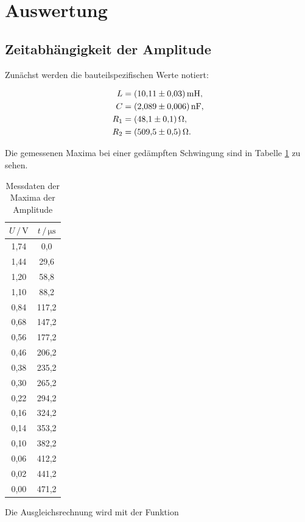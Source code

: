 \section{Auswertung}
\label{sec:Auswertung}

\subsection{Zeitabhängigkeit der Amplitude}

Zunächst werden die bauteilspezifischen Werte notiert:

\begin{align*}
L &= \SI{10.11+-0.03}{\milli\henry},\\
C &= \SI{2.089+-0.006}{\nano\farad},\\
R_1 &= \SI{48.1+-0.1}{\ohm},\\
R_2 &= \SI{509.5+-0.5}{\ohm}.
\end{align*}

Die gemessenen Maxima bei einer gedämpften Schwingung sind 
in Tabelle \ref{tab:Messdaten1} zu sehen. 

\begin{table}
\centering
\caption{Messdaten der Maxima der Amplitude}
\label{tab:Messdaten1}
\begin{tabular}{c c}
\toprule
$U \,/\, \si{\volt}$ & $t \,/\, \si{\micro\second}$\\
\midrule
1,74 &   0,0\\
1,44 &  29,6\\
1,20 &  58,8\\
1,10 &  88,2\\
0,84 & 117,2\\
0,68 & 147,2\\
0,56 & 177,2\\
0,46 & 206,2\\
0,38 & 235,2\\
0,30 & 265,2\\
0,22 & 294,2\\ 
0,16 & 324,2\\
0,14 & 353,2\\
0,10 & 382,2\\
0,06 & 412,2\\
0,02 & 441,2\\
0,00 & 471,2\\
\bottomrule
\end{tabular}
\end{table} 

Die Ausgleichsrechnung wird mit der Funktion 

